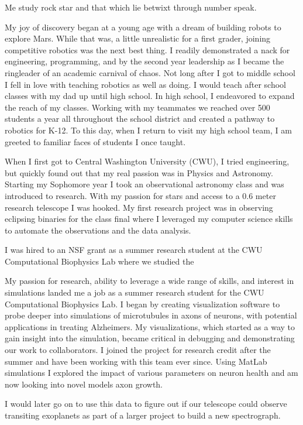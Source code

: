 \documentclass[a4paper, 12pt]{article}
\begin{document}
Me study rock star and that which lie betwixt through number speak.

My joy of discovery began at a young age with a dream of building robots to explore Mars. While that was, a little unrealistic for a first grader, joining competitive robotics was the next best thing. I readily demonstrated a nack for engineering, programming, and by the second year leadership as I became the ringleader of an academic carnival of chaos.
Not long after I got to middle school I fell in love with teaching robotics as well as doing. I would teach after school classes with my dad up until high school. In high school, I endeavored to expand the reach of my classes. Working with my teammates we reached over 500 students a year all throughout the school district and created a pathway to robotics for K-12. To this day, when I return to visit my high school team, I am greeted to familiar faces of students I once taught.

When I first got to Central Washington University (CWU), I tried engineering, but quickly found out that my real passion was in Physics and Astronomy. Starting my Sophomore year I took an observational astronomy class and was introduced to research. With my passion for stars and access to a 0.6 meter research telescope I was hooked. My first research project was in observing eclipsing binaries for the class final where I leveraged my computer science skills to automate the observations and the data analysis.

I was hired to an NSF grant as a summer research student at the CWU Computational Biophysics Lab where we studied the 

My passion for research, ability to leverage a wide range of skills, and interest in simulations landed me a job as a summer research student for the CWU Computational Biophysics Lab. I began by creating visualization software to probe deeper into simulations of microtubules in axons of neurons, with potential applications in treating Alzheimers. My visualizations, which started as a way to gain insight into the simulation, became critical in debugging and demonstrating our work to collaborators. I joined the project for research credit after the summer and have been working with this team ever since. Using MatLab simulations I explored the impact of various parameters on neuron health and am now looking into novel models axon growth.

I would later go on to use this data to figure out if our telescope could observe transiting exoplanets as part of a larger project to build a new spectrograph.
\end{document}
